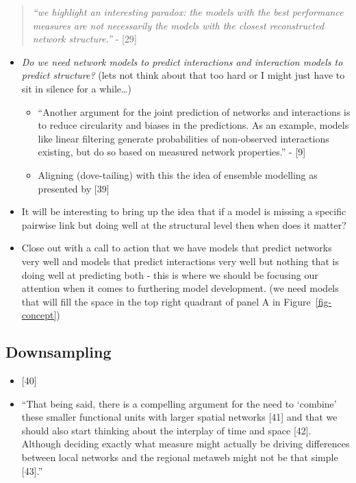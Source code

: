 \documentclass[
]{article}
\begin{document}
\begin{quote}
\emph{``we highlight an interesting paradox: the models with the best
performance measures are not necessarily the models with the closest
reconstructed network structure.''} - {[}29{]}
\end{quote}

\begin{itemize}
\item
  \emph{Do we need network models to predict interactions and
  interaction models to predict structure?} (lets not think about that
  too hard or I might just have to sit in silence for a while\ldots)

  \begin{itemize}
  \item
    ``Another argument for the joint prediction of networks and
    interactions is to reduce circularity and biases in the predictions.
    As an example, models like linear filtering generate probabilities
    of non-observed interactions existing, but do so based on measured
    network properties.'' - {[}9{]}
  \item
    Aligning (dove-tailing) with this the idea of ensemble modelling as
    presented by {[}39{]}
  \end{itemize}
\item
  It will be interesting to bring up the idea that if a model is missing
  a specific pairwise link but doing well at the structural level then
  when does it matter?
\item
  Close out with a call to action that we have models that predict
  networks very well and models that predict interactions very well but
  nothing that is doing well at predicting both - this is where we
  should be focusing our attention when it comes to furthering model
  development. (we need models that will fill the space in the top right
  quadrant of panel A in Figure~\ref{fig-concept})
\end{itemize}

\subsection{Downsampling}\label{downsampling}

\begin{itemize}
\item
  {[}40{]}
\item
  ``That being said, there is a compelling argument for the need to
  `combine' these smaller functional units with larger spatial networks
  {[}41{]} and that we should also start thinking about the interplay of
  time and space {[}42{]}. Although deciding exactly what measure might
  actually be driving differences between local networks and the
  regional metaweb might not be that simple {[}43{]}.''
\end{itemize}
\end{document}

